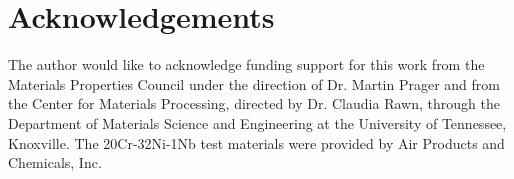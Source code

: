 \chapter*{Acknowledgements}
The author would like to acknowledge funding support for this work from the Materials Properties Council under the direction of Dr. Martin Prager and from the Center for Materials Processing, directed by Dr. Claudia Rawn, through the Department of Materials Science and Engineering at the University of Tennessee, Knoxville.  The 20Cr-32Ni-1Nb test materials were provided by Air Products and Chemicals, Inc.